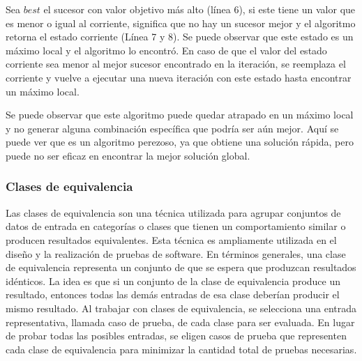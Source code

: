Sea $best$ el sucesor con valor objetivo más alto (línea 6), si este tiene un valor que es menor o igual al corriente, significa que no hay un sucesor mejor y el algoritmo retorna el estado corriente (Línea 7 y 8). Se puede observar que este estado es un máximo local y el algoritmo lo encontró.
En caso de que el valor del estado corriente sea menor al mejor sucesor encontrado en la iteración, se reemplaza el corriente y vuelve a ejecutar una nueva iteración con este estado hasta encontrar un máximo local.

Se puede observar que este algoritmo puede quedar atrapado en un máximo local y no generar alguna combinación específica que podría ser aún mejor. Aquí se puede ver que es un algoritmo perezoso, ya que obtiene una solución rápida, pero puede no ser eficaz en encontrar la mejor solución global. 


\subsubsection{Clases de equivalencia}
\label{alg:approachCE}
 Las clases de equivalencia son una técnica utilizada para agrupar conjuntos de datos de entrada en categorías o clases que tienen un comportamiento similar o producen resultados equivalentes. Esta técnica es ampliamente utilizada en el diseño y la realización de pruebas de software.
 En términos generales, una clase de equivalencia representa  un conjunto de que se espera que produzcan resultados idénticos. La idea es que si un conjunto de la clase de equivalencia produce un resultado, entonces todas las demás entradas de esa clase deberían producir el mismo resultado.
 Al trabajar con clases de equivalencia, se selecciona una entrada representativa, llamada caso de prueba, de cada clase para ser evaluada. En lugar de probar todas las posibles entradas, se eligen casos de prueba que representen cada clase de equivalencia para minimizar la cantidad total de pruebas necesarias.

